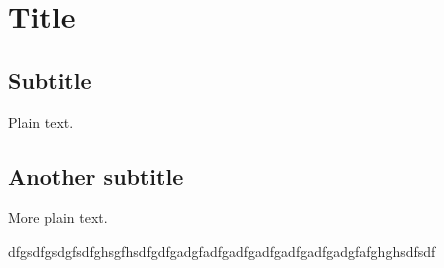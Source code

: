 \documentclass{article}
\begin{document}
\section{Title}

\subsection{Subtitle}

Plain text.

\subsection{Another subtitle}

More plain text.


dfgsdfgsdgfsdfghsgfhsdfgdfgadgfadfgadfgadfgadfgadfgadgfafghghsdfsdf
\end{document}
